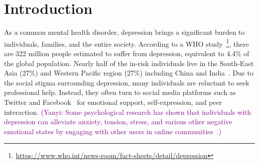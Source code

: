 \section{Introduction}
\label{sec:intro}
As a common mental health disorder, depression brings a significant burden to individuals, families, and the entire society. According to a WHO study~\footnote{\url{https://www.who.int/news-room/fact-sheets/detail/depression}}, there are 322 million people estimated to suffer from depression, equivalent to 4.4\% of the global population. Nearly half of the in-risk individuals live in the South-East Asia (27\%) and Western Pacific region (27\%) including China and India~\cite{tadesse2019detection}.
Due to the social stigma surrounding depression, many individuals are reluctant to seek professional help. Instead, they often turn to social media platforms such as Twitter and Facebook~\cite{lau2020android, park2013perception} for emotional support, self-expression, and peer interaction. \textcolor{purple}{(Yanyi: Some psychological research has shown that individuals with depression can alleviate anxiety, tension, stress, and various other negative emotional states by engaging with other users in online communities~\cite{Setoyama2011, Lu2021}.)}

